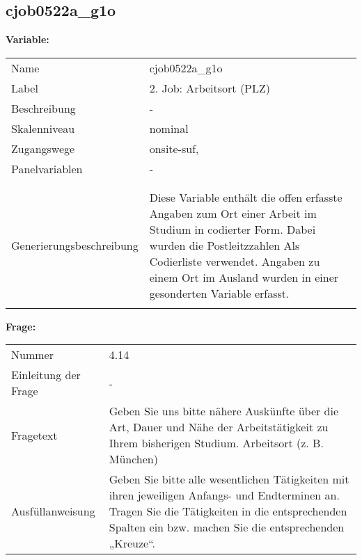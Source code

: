 	
	
	\subsection{cjob0522a\_g1o}
	\label{subSection:cjob0522a_g1o}

	\noindent\textbf{Variable:}\\
		\begin{tabular}{lL{11.3cm}}
			\label{tableVariable:cjob0522a_g1o}
			Name & cjob0522a\_g1o \\
			Label & 2. Job: Arbeitsort (PLZ) \\
			Beschreibung & - \\
			Skalenniveau & nominal \\
			Zugangswege &
				onsite-suf,
 \\
			Panelvariablen & -
			 \\
			 \\
 \\
					Generierungsbeschreibung & Diese Variable enthält die offen erfasste Angaben zum Ort einer Arbeit im Studium in codierter Form. Dabei wurden die Postleitzzahlen Als Codierliste verwendet. Angaben zu einem Ort im Ausland wurden in einer gesonderten Variable erfasst. 
				 \\	
			 \\
		\end{tabular}

		\vspace*{1 cm}
		\noindent\textbf{Frage:}\\
		\begin{tabular}{lL{11.3cm}}
			\label{tableQuestion:cjob0522a_g1o}
			Nummer & 4.14 \\
			Einleitung der Frage & - \\
			Fragetext & Geben Sie uns bitte nähere Auskünfte über die Art, Dauer und Nähe der Arbeitstätigkeit zu Ihrem bisherigen Studium.
Arbeitsort
(z. B. München) \\
			Ausfüllanweisung & Geben Sie bitte alle wesentlichen Tätigkeiten mit ihren jeweiligen Anfangs- und Endterminen an. Tragen Sie die Tätigkeiten in die entsprechenden Spalten ein bzw. machen Sie die entsprechenden „Kreuze“. \\
		\end{tabular}





